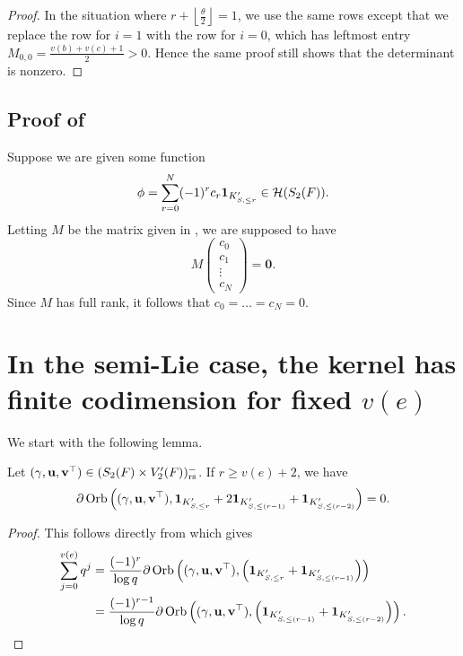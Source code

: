 \begin{proof}
  In the situation where $r + \left\lfloor \frac{\theta}{2} \right\rfloor = 1$,
  we use the same rows except that we replace the row for $i=1$
  with the row for $i=0$, which has leftmost entry $M_{0,0} = \frac{v(b)+v(c)+1}{2} > 0$.
  Hence the same proof still shows that the determinant is nonzero.
\end{proof}

\subsection{Proof of }
Suppose we are given some function
\[ \phi = \sum_{r=0}^N (-1)^r c_r \mathbf{1}_{K'_{S, \le r}} \in \mathcal H(S_2(F)). \]
Letting $M$ be the matrix given in ,
we are supposed to have
\[ M \begin{pmatrix} c_0 \\ c_1 \\ \vdots \\ c_N \end{pmatrix} = \mathbf{0}. \]
Since $M$ has full rank, it follows that $c_0 = \dots = c_N = 0$.

\section{In the semi-Lie case, the kernel has finite codimension for fixed $v(e)$}
We start with the following lemma.
\begin{lemma}
  \label{lem:semi_lie_large_r}
  Let ${(\gamma, \mathbf u, \mathbf v^\top)} \in (S_2(F) \times V'_2(F))_{\mathrm{rs}}^-$. If $r \ge v(e) + 2$, we have
  \[
    \partial \operatorname{Orb} \left( {(\gamma, \mathbf u, \mathbf v^\top)},
        \mathbf{1}_{K'_{S, \le r}} + 2 \mathbf{1}_{K'_{S, \le (r-1)}} + \mathbf{1}_{K'_{S, \le (r-2)}}
      \right) = 0.
  \]
\end{lemma}
\begin{proof}
  This follows directly from  which gives
  \begin{align*}
    \sum_{j=0}^{v(e)} q^j
    &= \frac{(-1)^r}{\log q} \partial
    \operatorname{Orb} \left( {(\gamma, \mathbf u, \mathbf v^\top)},
      \left(\mathbf{1}_{K'_{S, \le r}} + \mathbf{1}_{K'_{S, \le (r-1)}}\right)
      \right) \\
    &= \frac{(-1)^{r-1}}{\log q} \partial
    \operatorname{Orb} \left( {(\gamma, \mathbf u, \mathbf v^\top)},
      \left(\mathbf{1}_{K'_{S, \le (r-1)}} + \mathbf{1}_{K'_{S, \le (r-2)}}\right)
      \right). \qedhere
  \end{align*}
\end{proof}

